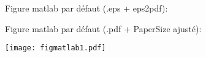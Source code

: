 \documentclass[12pt]{article}
\begin{document}
Figure matlab par défaut (.eps + eps2pdf):

\centerline{}	

Figure matlab par défaut (.pdf + PaperSize ajusté):

\centerline{}	

\pagebreak

\noindent\texttt{[image: figmatlab1.pdf]}

\noindent{}

\noindent
\begin{minipage}{.48\textwidth}
   \centerline{}
\end{minipage} \hfill
\begin{minipage}{.48\textwidth}
   \centerline{}
\end{minipage}
\end{document}

